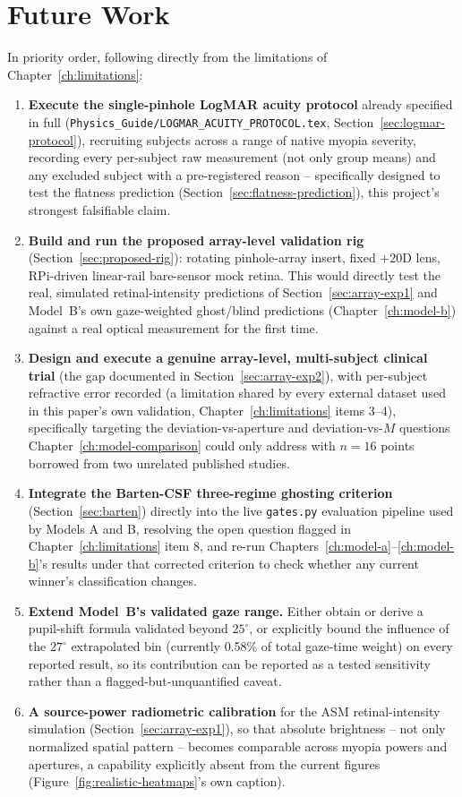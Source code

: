 \chapter{Future Work}
\label{ch:future}

In priority order, following directly from the limitations of Chapter~\ref{ch:limitations}:

\begin{enumerate}
\item \textbf{Execute the single-pinhole LogMAR acuity protocol} already specified in
full (\texttt{Physics\_Guide/LOGMAR\_ACUITY\_PROTOCOL.tex}, Section~\ref{sec:logmar-protocol}),
recruiting subjects across a range of native myopia severity, recording every
per-subject raw measurement (not only group means) and any excluded subject with a
pre-registered reason -- specifically designed to test the flatness prediction
(Section~\ref{sec:flatness-prediction}), this project's strongest falsifiable claim.
\item \textbf{Build and run the proposed array-level validation rig}
(Section~\ref{sec:proposed-rig}): rotating pinhole-array insert, fixed $+20$D lens,
RPi-driven linear-rail bare-sensor mock retina. This would directly test the real,
simulated retinal-intensity predictions of Section~\ref{sec:array-exp1} and Model~B's
own gaze-weighted ghost/blind predictions (Chapter~\ref{ch:model-b}) against a real
optical measurement for the first time.
\item \textbf{Design and execute a genuine array-level, multi-subject clinical trial}
(the gap documented in Section~\ref{sec:array-exp2}), with per-subject refractive error
recorded (a limitation shared by every external dataset used in this paper's own
validation, Chapter~\ref{ch:limitations} items 3--4), specifically targeting the
deviation-vs-aperture and deviation-vs-$M$ questions Chapter~\ref{ch:model-comparison}
could only address with $n=16$ points borrowed from two unrelated published studies.
\item \textbf{Integrate the Barten-CSF three-regime ghosting criterion}
(Section~\ref{sec:barten}) directly into the live \texttt{gates.py} evaluation pipeline
used by Models A and B, resolving the open question flagged in Chapter~\ref{ch:limitations}
item 8, and re-run Chapters~\ref{ch:model-a}--\ref{ch:model-b}'s results under that
corrected criterion to check whether any current winner's classification changes.
\item \textbf{Extend Model~B's validated gaze range.} Either obtain or derive a
pupil-shift formula validated beyond $25^\circ$, or explicitly bound the influence of
the $27^\circ$ extrapolated bin (currently 0.58\% of total gaze-time weight) on every
reported result, so its contribution can be reported as a tested sensitivity rather
than a flagged-but-unquantified caveat.
\item \textbf{A source-power radiometric calibration} for the ASM retinal-intensity
simulation (Section~\ref{sec:array-exp1}), so that absolute brightness -- not only
normalized spatial pattern -- becomes comparable across myopia powers and apertures, a
capability explicitly absent from the current figures
(Figure~\ref{fig:realistic-heatmaps}'s own caption).
\end{enumerate}
